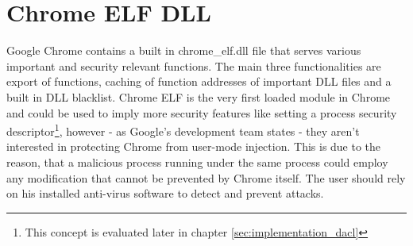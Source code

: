 \section{Chrome ELF DLL}
Google Chrome contains a built in chrome\_elf.dll file that serves various important and security relevant functions. The main three functionalities are export of functions, caching of function addresses of important DLL files and a built in DLL blacklist. Chrome ELF is the very first loaded module in Chrome and could be used to imply more security features like setting a process security descriptor\footnote{This concept is evaluated later in chapter \ref{sec:implementation_dacl}}, however - as Google's development team states - they aren't interested in protecting Chrome from user-mode injection\cite{chromium_security}. This is due to the reason, that a malicious process running under the same process could employ any modification that cannot be prevented by Chrome itself. The user should rely on his installed anti-virus software to detect and prevent attacks.


